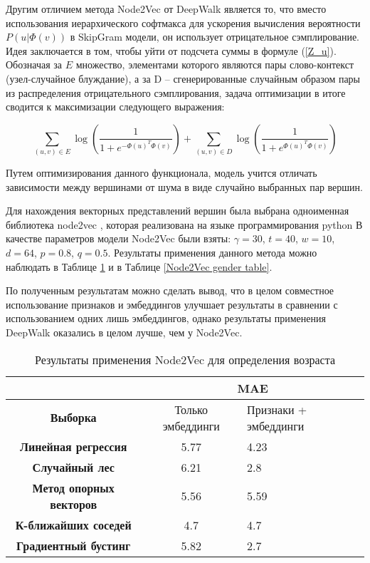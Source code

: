 Другим отличием метода Node2Vec от DeepWalk является то, что вместо использования иерархического софтмакса для ускорения вычисления вероятности $P(u | \Phi(v))$ в SkipGram модели, он использует отрицательное сэмплирование. Идея заключается в том, чтобы уйти от подсчета суммы в формуле (\ref{Z_u}). Обозначая за $E$ множество, элементами которого являются пары слово-контекст (узел-случайное блуждание), а за D -- сгенерированные случайным образом пары из распределения отрицательного сэмплирования, задача оптимизации в итоге сводится к максимизации следующего выражения:

$$
\sum_{(u, v) \in E} \log (\frac{1}{1 + e^{-\Phi(u)^T \Phi(v)}}) + \sum_{(u, v) \in D} \log (\frac{1}{1 + e^{\Phi(u)^T \Phi(v)}}) 
$$

Путем оптимизирования данного функционала, модель учится отличать зависимости между вершинами от шума в виде случайно
выбранных пар вершин.

Для нахождения векторных представлений вершин была выбрана одноименная библиотека node2vec \cite{node2vec lib}, которая реализована на языке программирования python  В качестве параметров модели Node2Vec были взяты: $\gamma = 30$, $t = 40$, $w = 10$, $d = 64$, $p = 0.8$, $q = 0.5$. 
Результаты применения данного метода можно наблюдать в Таблице \ref{Node2Vec age table} и в Таблице \ref{Node2Vec gender table}. 

По полученным результатам можно сделать вывод, что в целом совместное использование признаков и эмбеддингов улучшает результаты в сравнении с использованием одних лишь эмбеддингов, однако результаты применения DeepWalk оказались в целом лучше, чем у Node2Vec.

\begin{table}[h!]
\centering
\begin{tabular}{|c|c|l|}
\hline
\textbf{}                       & \multicolumn{2}{c|}{MAE}                  \\ \hline
\textbf{Выборка}                & Только эмбеддинги & Признаки + эмбеддинги \\ \hline
\textbf{Линейная регрессия}     &    5.77               &     4.23                  \\ \hline
\textbf{Случайный лес}          &    6.21               &    2.8                   \\ \hline
\textbf{Метод опорных векторов} &      5.56             &      5.59                 \\ \hline
\textbf{К-ближайших соседей}    &       4.7            &        4.7               \\ \hline
\textbf{Градиентный бустинг}    &      5.82             &        2.7               \\ \hline
\end{tabular}
\caption{Результаты применения Node2Vec для определения возраста}
\label{Node2Vec age table}
\end{table}

